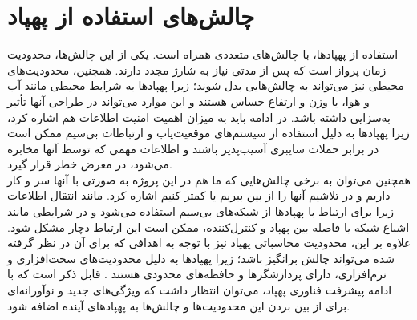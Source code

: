  \section{چالش‌های استفاده از پهپاد}
 استفاده از پهپادها، با چالش‌های متعددی همراه است. یکی از این چالش‌ها، محدودیت زمان پرواز است که پس از مدتی نیاز به شارژ مجدد دارند. 
 همچنین، محدودیت‌های محیطی نیز می‌تواند به چالش‌هایی بدل شوند؛ زیرا پهپادها به شرایط محیطی مانند آب و هوا، یا وزن و ارتفاع حساس هستند و این موارد می‌تواند 
 در طراحی آنها تأثیر به‌سزایی داشته باشد. در ادامه باید به میزان اهمیت امنیت اطلاعات هم اشاره کرد، زیرا پهپادها به دلیل استفاده از سیستم‌های موقعیت‌یاب و ارتباطات بی‌سیم ممکن 
 است در برابر حملات سایبری آسیب‌پذیر باشند و اطلاعات مهمی که توسط آنها مخابره می‌شود، در معرض خطر قرار گیرد.
 \\
 همچنین می‌توان به برخی چالش‌هایی که ما هم در این پروژه به صورتی با آنها سر و کار داریم و در تلاشیم آنها را از بین ببریم یا کمتر کنیم اشاره کرد. 
 مانند انتقال اطلاعات زیرا برای ارتباط با پهپادها از شبکه‌های بی‌سیم استفاده می‌شود و در شرایطی مانند اشباع شبکه یا فاصله بین پهپاد و کنترل‌کننده، ممکن است این ارتباط دچار مشکل شود.
 علاوه بر این، محدودیت محاسباتی پهپاد نیز با توجه به اهدافی که برای آن در نظر گرفته شده می‌تواند چالش برانگیز باشد؛ زیرا پهپادها به دلیل محدودیت‌های سخت‌افزاری و نرم‌افزاری، دارای پردازشگرها و حافظه‌های محدودی هستند \cite{hassanalian2017classifications}.
 قابل ذکر است که با ادامه پیشرفت فناوری پهپاد، می‌توان انتظار داشت که ویژگی‌های جدید و نوآورانه‌ای برای از بین بردن این محدودیت‌ها و چالش‌ها به‌ پهپادهای آینده اضافه شود.

